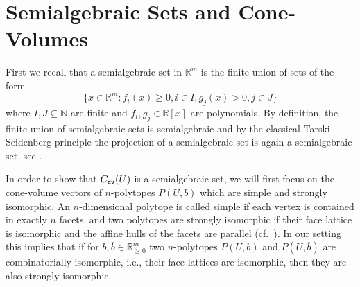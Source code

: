 \documentclass[11pt, a4paper, twoside, reqno]{amsart}
\newcommand{\R}{\mathbb{R}}
\newcommand{\N}{\mathbb{N}}
\theoremstyle{definition}
\theoremstyle{remark}
\newcommand{\cv}{{\tt cv}}
\newcommand{\ov}{\overline}
\numberwithin{equation}{section}
\begin{document}
    \section{Semialgebraic Sets and Cone-Volumes}
\label{Section:SemialgebraicSets}
First we recall that a semialgebraic set in $\R^m$ is the finite union of sets of the form
\begin{equation*}
                      \{ x\in\R^m : f_i(x)\geq 0, i\in I, g_j(x)>0, j\in J \}
\end{equation*}
where $I,J\subseteq \N$ are finite and $f_i,g_j\in\R[x]$ are
polynomials. By definition, the finite union of semialgebraic sets is
semialgebraic and by the classical Tarski-Seidenberg principle the
projection of a semialgebraic set is again a semialgebraic set, see
\cite[Theorem 2.2.1.]{bochnak2013real}.




In order to show that $C_\cv(U)$ is a semialgebraic set, we will first focus on the cone-volume vectors of $n$-polytopes $P(U,b)$ which are simple and strongly isomorphic. An $n$-dimensional polytope is called  simple if each vertex is contained in exactly $n$ facets, and two polytopes are strongly isomorphic if their face lattice is isomorphic and the affine hulls of the facets are parallel (cf.~\cite{Schneider2014}). In our setting this implies that if for $b,\ov b\in\R^m_{\geq 0}$ two $n$-polytopes  $P(U,b)$ and $P(U,\ov b)$ are combinatorially isomorphic, i.e., their face lattices are isomorphic, then they are also strongly isomorphic.
\end{document}
